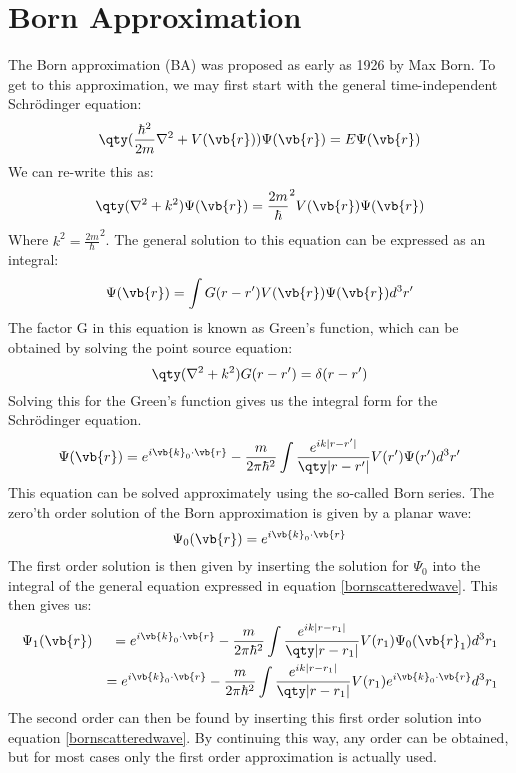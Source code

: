 \section{Born Approximation}\label{bornapproximation}
The Born approximation (BA) was proposed as early as 1926 by Max Born. To get to this approximation, we may first start with the general time-independent Schrödinger equation:
\begin{equation}
	\qty(\frac{\hbar^2}{2m} \nabla^2 + V(\vb{r}))\Psi(\vb{r}) = E \Psi(\vb{r}) 
\end{equation}
We can re-write this as:
\begin{equation}
\qty(\nabla^2 + k^2)\Psi(\vb{r}) = \frac{2m}{\hbar}^2 V(\vb{r})\Psi(\vb{r}) 
\end{equation}
Where $k^2 = \frac{2m}{\hbar}^2$. The general solution to this equation can be expressed as an integral:
\begin{equation}
\Psi(\vb{r}) = \int G(r-r')V(\vb{r})\Psi(\vb{r})d^3r'
\end{equation}
The factor G in this equation is known as Green’s function, which can be obtained by solving the point source equation:
\begin{equation}
\qty(\nabla^2 + k^2)G(r-r') = \delta(r-r')
\end{equation}
Solving this for the Green's function gives us the integral form for the Schrödinger equation.
\begin{equation}
\label{bornscatteredwave}
\Psi(\vb{r}) = e^{i\vb{k}_0\cdot \vb{r}} - \frac{m}{2 \pi \hbar^2} \int \frac{e^{ik|r-r'|}}{\qty|r-r'|}V(r')\Psi(r')d^3 r'
\end{equation}
This equation can be solved approximately using the so-called Born series. The zero’th order solution of the Born approximation is given by a planar wave: 
\begin{equation}
		\Psi_0(\vb{r})  = e^{i\vb{k}_0\cdot \vb{r}}
\end{equation}
The first order solution is then given by inserting the solution for $\Psi_0$ into the integral of the general equation expressed in equation \ref{bornscatteredwave}. This then gives us:
\begin{eqnarray}
	\Psi_1(\vb{r}) &&= e^{i\vb{k}_0\cdot \vb{r}} - \frac{m}{2 \pi \hbar^2} \int \frac{e^{ik|r-r_1|}}{\qty|r-r_1|}V(r_1)\Psi_0(\vb{r}_1)d^3 r_1
 \\ 
	&&= e^{i\vb{k}_0\cdot \vb{r}} - \frac{m}{2 \pi \hbar^2} \int \frac{e^{ik|r-r_1|}}{\qty|r-r_1|}V(r_1)e^{i\vb{k}_0\cdot \vb{r}}d^3 r_1
\end{eqnarray}
 The second order can then be found by inserting this first order solution into equation \ref{bornscatteredwave}. By continuing this way, any order can be obtained, but for most cases only the first order approximation is actually used.
